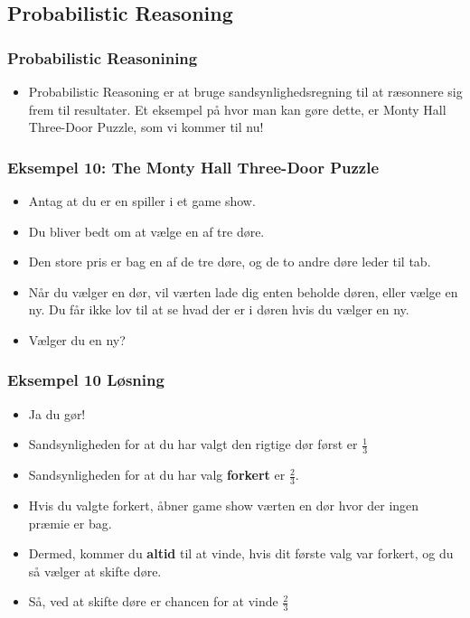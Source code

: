 \documentclass{beamer}
\begin{document}
\subsection{Probabilistic Reasoning}
\label{subsec:probabilistic-reasoning}

\begin{frame}
  \frametitle{Probabilistic Reasonining}
 \begin{itemize}
 \item Probabilistic Reasoning er at bruge sandsynlighedsregning til at ræsonnere sig frem til resultater. Et eksempel på hvor man kan gøre dette, er Monty Hall Three-Door Puzzle, som vi kommer til nu!
 \end{itemize} 
\end{frame}

\begin{frame}
  \frametitle{Eksempel 10: The Monty Hall Three-Door Puzzle}
  \begin{itemize}
  \item Antag at du er en spiller i et game show.
  \item Du bliver bedt om at vælge en af tre døre.
  \item Den store pris er bag en af de tre døre, og de to andre døre leder til tab.
  \item Når du vælger en dør, vil værten lade dig enten beholde døren, eller vælge en ny. Du får ikke lov til at se hvad der er i døren hvis du vælger en ny.
  \item Vælger du en ny? 
  \end{itemize}
\end{frame}

\begin{frame}
  \frametitle{Eksempel 10 Løsning}
  
  \begin{itemize}
  \item Ja du gør!
  \item Sandsynligheden for at du har valgt den rigtige dør først er $\frac{1}{3}$
  \item Sandsynligheden for at du har valg \textbf{forkert} er $\frac{2}{3}$. 
  \item Hvis du valgte forkert, åbner game show værten en dør hvor der ingen præmie er bag.
  \item Dermed, kommer du \textbf{altid} til at vinde, hvis dit første valg var forkert, og du så vælger at skifte døre.
  \item Så, ved at skifte døre er chancen for at vinde $\frac{2}{3}$
  \end{itemize}
\end{frame}
\end{document}

